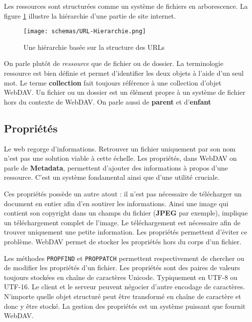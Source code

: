 \documentclass[a4paper, 11pt]{article}
\begin{document}
{		Les ressources sont structurées comme un système de fichiers en arborescence. La figure \ref{fig:file_structure} illustre la hiérarchie d'une partie de site internet. 

		\begin{figure}[htc]
		\begin{center}
		\texttt{[image: schemas/URL-Hierarchie.png]}
		\caption{Une hiérarchie basée sur la structure des URLs}
		\label{fig:file_structure}
		\end{center}
		\end{figure}
		
		On parle plutôt de \emph{ressource} que de fichier ou de dossier. La terminologie ressource est bien définie et permet d'identifier les deux objets à l'aide d'un seul mot. Le terme \textbf{collection} fait toujours référence à une collection d'objet WebDAV. Un fichier ou un dossier est un élément propre à un système de fichier hors du contexte de WebDAV. On parle aussi de \textbf{parent} et d'\textbf{enfant}

	\subsection{Propriétés}
	
		Le web regorge d'informations. Retrouver un fichier uniquement par son nom n'est pas une solution viable à cette échelle. Les propriétés, dans WebDAV on parle de \textbf{Metadata}, permettent d'ajouter des informations à propos d'une ressource. C'est un système fondamental ainsi que d'une utilité cruciale. 
		
		Ces propriétés possède un autre atout : il n'est pas nécessaire de télécharger un document en entier afin d'en soutirer les informations. Ainsi une image qui contient son copyright dans un champs du fichier (\textbf{JPEG} par exemple), implique un téléchargement complet de l'image. Le téléchargement est nécessaire afin de trouver uniquement une petite information. Les propriétés permettent d'éviter ce problème. WebDAV permet de stocker les propriétés hors du corps d'un fichier.
		
		Les méthodes \texttt{PROPFIND} et \texttt{PROPPATCH} permettent respectivement de chercher ou de modifier les propriétés d'un fichier. Les propriétés sont des paires de valeurs toujours stockées en chaîne de caractères Unicode. Typiquement en UTF-8 ou UTF-16. Le client et le serveur peuvent négocier d'autre encodage de caractères. N'importe quelle objet structuré peut être transformé en chaîne de caractère et donc y être stocké. La gestion des propriétés est un système puissant que fournit WebDAV.
		
}
\end{document}

